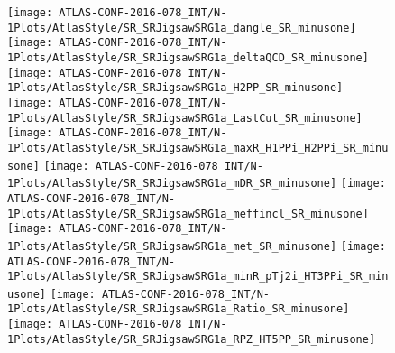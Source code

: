\begin{figure}[tbph]
\begin{center}
\texttt{[image: ATLAS-CONF-2016-078\_INT/N-1Plots/AtlasStyle/SR\_SRJigsawSRG1a\_dangle\_SR\_minusone]}
\texttt{[image: ATLAS-CONF-2016-078\_INT/N-1Plots/AtlasStyle/SR\_SRJigsawSRG1a\_deltaQCD\_SR\_minusone]}
\texttt{[image: ATLAS-CONF-2016-078\_INT/N-1Plots/AtlasStyle/SR\_SRJigsawSRG1a\_H2PP\_SR\_minusone]}
\texttt{[image: ATLAS-CONF-2016-078\_INT/N-1Plots/AtlasStyle/SR\_SRJigsawSRG1a\_LastCut\_SR\_minusone]}
\texttt{[image: ATLAS-CONF-2016-078\_INT/N-1Plots/AtlasStyle/SR\_SRJigsawSRG1a\_maxR\_H1PPi\_H2PPi\_SR\_minusone]}
\texttt{[image: ATLAS-CONF-2016-078\_INT/N-1Plots/AtlasStyle/SR\_SRJigsawSRG1a\_mDR\_SR\_minusone]}
\texttt{[image: ATLAS-CONF-2016-078\_INT/N-1Plots/AtlasStyle/SR\_SRJigsawSRG1a\_meffincl\_SR\_minusone]}
\texttt{[image: ATLAS-CONF-2016-078\_INT/N-1Plots/AtlasStyle/SR\_SRJigsawSRG1a\_met\_SR\_minusone]}
\texttt{[image: ATLAS-CONF-2016-078\_INT/N-1Plots/AtlasStyle/SR\_SRJigsawSRG1a\_minR\_pTj2i\_HT3PPi\_SR\_minusone]}
\texttt{[image: ATLAS-CONF-2016-078\_INT/N-1Plots/AtlasStyle/SR\_SRJigsawSRG1a\_Ratio\_SR\_minusone]}
\texttt{[image: ATLAS-CONF-2016-078\_INT/N-1Plots/AtlasStyle/SR\_SRJigsawSRG1a\_RPZ\_HT5PP\_SR\_minusone]}
\end{center}
\caption{}
\label{fig:SR_SRJigsawSRG1a_maxR_H1PPi_H2PPi_SR_minusone}
\end{figure}

\begin{figure}[tbph]
\begin{center}
\end{center}
\caption{}
\label{fig:SR_SRJigsawSRG1a_RPZ_HT5PP_SR_minusone}
\end{figure}

